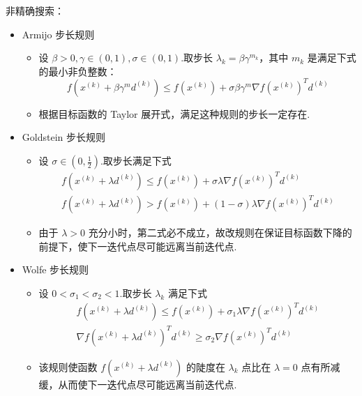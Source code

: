 \begin{note}
    非精确搜索：
    \begin{itemize}
        \item Armijo 步长规则\begin{itemize}
            \item 设 $\beta > 0, \gamma \in (0, 1), \sigma \in (0, 1)$.取步长 $\lambda_k = \beta \gamma^{m_k}$，其中 $m_k$ 是满足下式的最小非负整数：\[f\left(x^{(k)}+\beta \gamma^{m} d^{(k)}\right) \leq f\left(x^{(k)}\right)+\sigma \beta \gamma^{m} \nabla f\left(x^{(k)}\right)^{T} d^{(k)}\]
            \item 根据目标函数的 Taylor 展开式，满足这种规则的步长一定存在.
        \end{itemize}
        \item Goldstein 步长规则\begin{itemize}
            \item 设 $\sigma \in (0, \frac{1}{2})$.取步长满足下式\begin{gather*}
                f\left(x^{(k)}+\lambda d^{(k)}\right) \leq f\left(x^{(k)}\right)+\sigma \lambda \nabla f\left(x^{(k)}\right)^{T} d^{(k)} \\
                f\left(x^{(k)}+\lambda d^{(k)}\right)>f\left(x^{(k)}\right)+(1-\sigma) \lambda \nabla f\left(x^{(k)}\right)^{T} d^{(k)}
            \end{gather*}
            \item 由于 $\lambda > 0$ 充分小时，第二式必不成立，故改规则在保证目标函数下降的前提下，使下一迭代点尽可能远离当前迭代点.
        \end{itemize}
        \item Wolfe 步长规则\begin{itemize}
            \item 设 $0 < \sigma_1 < \sigma_2 < 1$.取步长 $\lambda_k$ 满足下式\begin{gather*}
                f\left(x^{(k)}+\lambda d^{(k)}\right) \leq f\left(x^{(k)}\right)+\sigma_{1} \lambda \nabla f\left(x^{(k)}\right)^{T} d^{(k)} \\
                \nabla f\left(x^{(k)}+\lambda d^{(k)}\right)^{T} d^{(k)} \geq \sigma_{2} \nabla f\left(x^{(k)}\right)^{T} d^{(k)}
            \end{gather*}
            \item 该规则使函数 $f(x^{(k)} + \lambda d^{(k)})$ 的陡度在 $\lambda_k$ 点比在 $\lambda = 0$ 点有所减缓，从而使下一迭代点尽可能远离当前迭代点.
        \end{itemize}
    \end{itemize}
\end{note}
